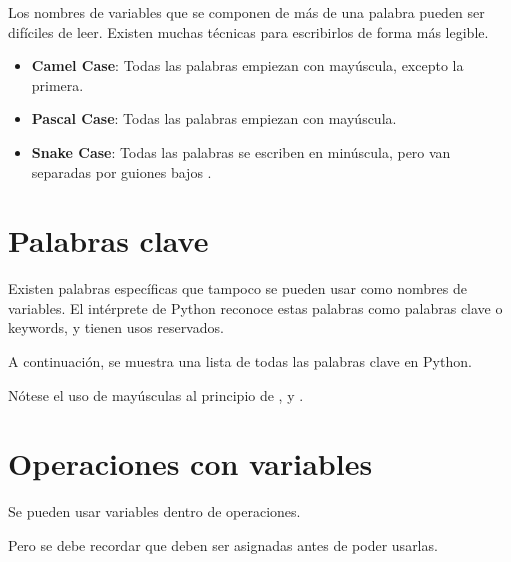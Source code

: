 Los nombres de variables que se componen de más de una palabra pueden ser difíciles de leer. Existen muchas técnicas para escribirlos de forma más legible.

\begin{itemize}
  \item \textbf{Camel Case}: Todas las palabras empiezan con mayúscula, excepto la primera.
  

  \item \textbf{Pascal Case}: Todas las palabras empiezan con mayúscula.
  

  \item \textbf{Snake Case}: Todas las palabras se escriben en minúscula, pero van separadas por guiones bajos \ttt{\_}.
  

\end{itemize}

\section{Palabras clave}

Existen palabras específicas que tampoco se pueden usar como nombres de variables. El intérprete de Python reconoce estas palabras como palabras clave o keywords, y tienen usos reservados.\smallskip

A continuación, se muestra una lista de todas las palabras clave en Python.


Nótese el uso de mayúsculas al principio de ,  y .

\section{Operaciones con variables}

Se pueden usar variables dentro de operaciones.


Pero se debe recordar que deben ser asignadas antes de poder usarlas.


